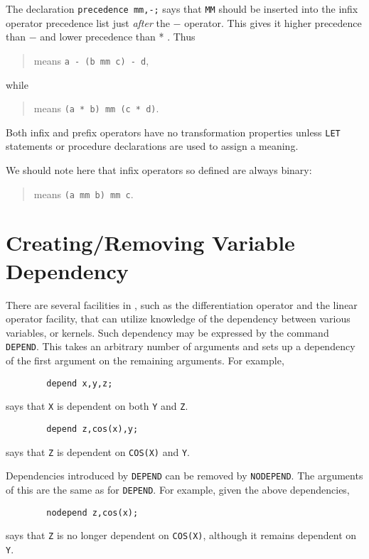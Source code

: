 The declaration {\tt precedence mm,-;} says that {\tt MM} should be
inserted into the infix operator precedence list just {\em after\/}
the $-$ operator.  This gives it higher precedence than $-$ and lower
precedence than * .  Thus

\begin{quote}
\hspace{0.2in}{\tt a - b mm c - d}\hspace{.3in} means \hspace{.3in}
{\tt a - (b mm c) - d},
\end{quote}
while
\begin{quote}
\hspace{0.2in}{\tt   a * b mm c * d}\hspace{.3in} means \hspace{.3in}
{\tt (a * b) mm (c * d)}.
\end{quote}

Both infix and prefix operators have no transformation
properties unless {\tt LET} statements or procedure
declarations are used to assign a meaning.

We should note here that infix operators so defined are always binary:
\begin{quote}
\hspace{0.2in}{\tt a mm b mm c}\hspace{.3in} means \hspace{.3in}
{\tt (a mm b) mm c}.
\end{quote}

\section{Creating/Removing Variable Dependency}

There are several facilities in {\REDUCE}, such as the differentiation
operator and the linear operator facility, that
can utilize knowledge of the dependency between various variables, or
kernels.  Such dependency may be expressed by the command {\tt
DEPEND}. This takes an arbitrary number of arguments and
sets up a dependency of the first argument on the remaining arguments.
For example,
\begin{verbatim}
        depend x,y,z;
\end{verbatim}
says that {\tt X} is dependent on both {\tt Y} and {\tt Z}.
\begin{verbatim}
        depend z,cos(x),y;
\end{verbatim}
says that {\tt Z} is dependent on {\tt COS(X)} and {\tt Y}.

Dependencies introduced by {\tt DEPEND} can be removed by {\tt NODEPEND}.
 The arguments of this are the same as for {\tt DEPEND}.
For example, given the above dependencies,
\begin{verbatim}
        nodepend z,cos(x);
\end{verbatim}
says that {\tt Z} is no longer dependent on {\tt COS(X)}, although it remains
dependent on {\tt Y}.

